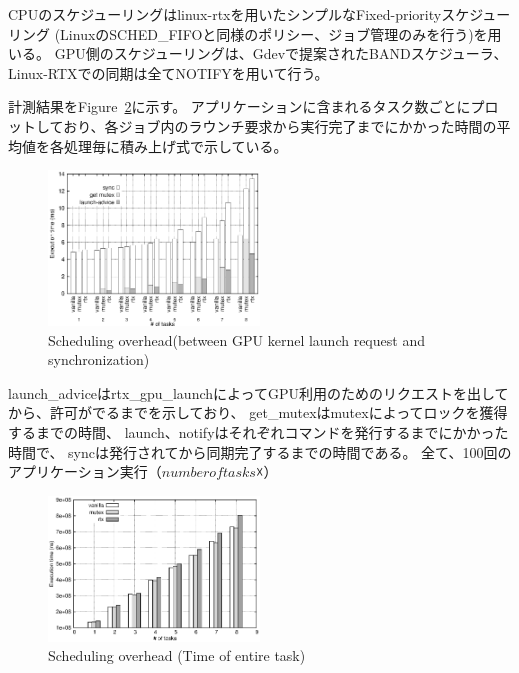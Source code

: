 CPUのスケジューリングはlinux-rtxを用いたシンプルなFixed-priorityスケジューリング (LinuxのSCHED\_FIFOと同様のポリシー、ジョブ管理のみを行う)を用いる。
GPU側のスケジューリングは、Gdevで提案されたBANDスケジューラ、Linux-RTXでの同期は全てNOTIFYを用いて行う。

計測結果をFigure~\ref{fig:fp_overhead}に示す。
アプリケーションに含まれるタスク数ごとにプロットしており、各ジョブ内のラウンチ要求から実行完了までにかかった時間の平均値を各処理毎に積み上げ式で示している。


\begin{figure}[t]
\begin{center}
\includegraphics[width=0.5\textwidth]{img/sum_task_fp.eps}
\caption{Scheduling overhead(between GPU kernel launch request and synchronization)}
\end{center}
\label{fig:fp_overhead}
\end{figure}


launch\_adviceはrtx\_gpu\_launchによってGPU利用のためのリクエストを出してから、許可がでるまでを示しており、
get\_mutexはmutexによってロックを獲得するまでの時間、
launch、notifyはそれぞれコマンドを発行するまでにかかった時間で、
syncは発行されてから同期完了するまでの時間である。
全て、100回のアプリケーション実行（$number of tasks ☓$）

\begin{figure}[t]
\begin{center}
\includegraphics[width=0.5\textwidth]{img/sum_task.eps}
\caption{Scheduling overhead (Time of entire task)}
\end{center}
\label{fig:fp_overhead}
\end{figure}


